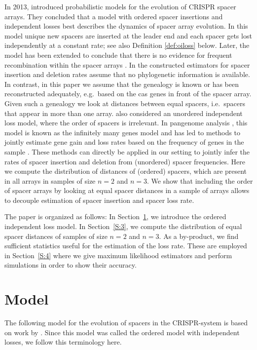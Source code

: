\documentclass[preprint,authoryear]{elsarticle}
\theoremstyle{definition}
\numberwithin{equation}{section}
\numberwithin{figure}{section}
\begin{document}
In 2013, \citeauthor{Kupczok2013} introduced probabilistic models for
the evolution of CRISPR spacer arrays.  They concluded that a model with ordered spacer insertions
and independent losses best describes the dynamics of spacer
array evolution.  In this model unique new spacers are inserted at the
leader end and each spacer gets lost independently at a constant rate;
see also Definition \ref{def:oiloss} below. Later, the model has been
extended to conclude that there is no evidence for frequent
recombination within the spacer arrays \citep{Kupczok2015}.  In
\cite{Kupczok2013} the constructed estimators for spacer insertion and
deletion rates assume that no phylogenetic information is available.
In contrast, in this paper we assume that the genealogy is known or has been
reconstructed adequately, e.g.\ based on the cas genes in front of the
spacer array. Given such a genealogy we look at distances between
equal spacers, i.e.\ spacers that appear in more than one array.
\cite{Kupczok2013} also considered an unordered independent loss
model, where the order of spacers is irrelevant. In pangenome analysis
\citep{Mira2010,Vernikos2014}, this model is known as the infinitely
many genes model \citep{BaumdickerHessPfaffelhuber2010} and has led to
methods to jointly estimate gene gain and loss rates based on the
frequency of genes in the sample
\citep{BaumdickerPfaffelhuberHess2012}. These methods can directly be
applied in our setting to jointly infer the rates of spacer insertion
and deletion from (unordered) spacer frequencies.  Here we compute the
distribution of distances of (ordered) spacers, which are present in
all arrays in samples of size $n=2$ and $n=3$.  We show that including
the order of spacer arrays by looking at equal spacer distances in a
sample of arrays allows to decouple estimation of spacer insertion and
spacer loss rate.

The paper is organized as follows: In Section~\ref{S:2}, we introduce
the ordered independent loss model. In Section~\ref{S:3}, we compute
the distribution of equal spacer distances of samples of size $n=2$
and $n=3$. As a by-product, we find sufficient statistics useful for
the estimation of the loss rate. These are employed in
Section~\ref{S:4} where we give maximum likelihood estimators and
perform simulations in order to show their accuracy.

\section{Model}
\label{S:2}
The following model for the evolution of spacers in the CRISPR-system
is based on work by \cite{Kupczok2013}. Since this model was called
the ordered model with independent losses, we follow this terminology here.
\end{document}
